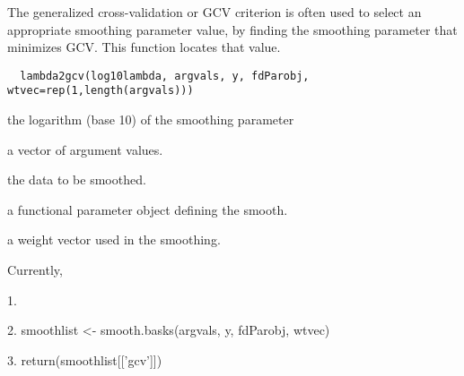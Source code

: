 \documentclass{article}
\begin{document}
\begin{Description}\relax
The generalized cross-validation or GCV criterion is often used to
select an appropriate smoothing parameter value, by finding the
smoothing parameter that minimizes GCV.  This function locates that
value.
\end{Description}
\begin{Usage}
\begin{verbatim}
  lambda2gcv(log10lambda, argvals, y, fdParobj, wtvec=rep(1,length(argvals)))
\end{verbatim}
\end{Usage}
\begin{Arguments}
\begin{ldescription}
\item[\code{log10lambda}] the logarithm (base 10) of the smoothing parameter

\item[\code{argvals}] a vector of argument values.

\item[\code{y}] the data to be smoothed.

\item[\code{fdParobj}] a functional parameter object defining the smooth.

\item[\code{wtvec}] a weight vector used in the smoothing.

\end{ldescription}
\end{Arguments}
\begin{Details}\relax
Currently, 
\end{Details}
\begin{Value}
1.  

2.  smoothlist <- smooth.basks(argvals, y, fdParobj, wtvec)

3.  return(smoothlist[['gcv']])
\end{Value}
\begin{SeeAlso}\relax
{}
\end{SeeAlso}
\end{document}
